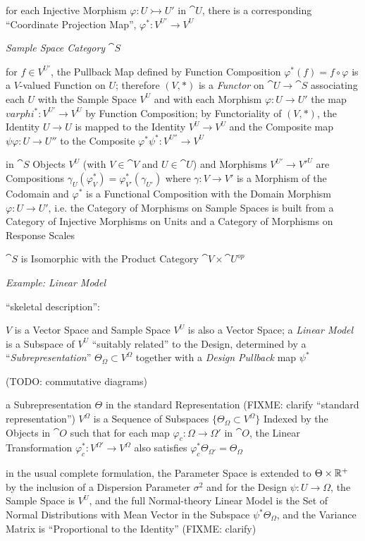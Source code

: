 for each Injective Morphism $\varphi : U \rightarrowtail U'$ in $\cat{U}$, there
is a corresponding ``Coordinate Projection Map'', $\varphi^* : V^{U'} \to V^{U}$

\emph{Sample Space Category} $\cat{S}$

for $f \in V^{U'}$, the Pullback Map defined by Function Composition
$\varphi^* (f) = f \circ \varphi$ is a $V$-valued Function on $U$; therefore
$(V, *)$ is a \emph{Functor} on $\cat{U} \to \cat{S}$ associating each $U$ with
the Sample Space $V^U$ and with each Morphism $\varphi : U \to U'$ the map
$varphi^* : V^{U'} \to V^U$ by Function Composition; by Functoriality of
$(V, *)$, the Identity $U \to U$ is mapped to the Identity $V^U \to V^U$ and the
Composite map $\psi\varphi : U \to U''$ to the Composite
$\varphi^*\psi^* : V^{U''} \to V^U$

in $\cat{S}$ Objects $V^U$ (with $V \in \cat{V}$
and $U \in \cat{U}$) and Morphisms $V^{U'} \to V'^{U}$ are Compositions
$\gamma_U(\varphi_V^*) = \varphi_{V'}^*(\gamma_{U'})$ where $\gamma : V \to V'$
is a Morphism of the Codomain and $\varphi^*$ is a  Functional Composition with
the Domain Morphism $\varphi : U \to U'$, i.e. the Category of Morphisms on
Sample Spaces is built from a Category of Injective Morphisms on Units and a
Category of Morphisms on Response Scales

$\cat{S}$ is Isomorphic with the Product Category $\cat{V} \times \cat{U}^{op}$

\emph{Example: Linear Model}

``skeletal description'':

$V$ is a Vector Space and Sample Space $V^U$ is also a Vector Space; a
\emph{Linear Model} is a Subspace of $V^U$ ``suitably related'' to the Design,
determined by a ``\emph{Subrepresentation}'' $\Theta_\Omega \subset V^{\Omega}$
together with a \emph{Design Pullback} map $\psi^*$

(TODO: commutative diagrams)

a Subrepresentation $\Theta$ in the standard Representation (FIXME: clarify
``standard representation'') $V^{\Omega}$ is a
Sequence of Subspaces $\{ \Theta_\Omega \subset V^\Omega \}$ Indexed by the
Objects in $\cat{O}$ such that for each map $\varphi_c : \Omega \to \Omega'$ in
$\cat{O}$, the Linear Transformation $\varphi_c^* : V^{\Omega'} \to V^\Omega$
also satisfies $\varphi_c^* \Theta_{\Omega'} = \Theta_\Omega$

in the usual complete formulation, the Parameter Space is extended to
$\Theta \times \mathbb{R}^+$ by the inclusion of a Dispersion Parameter $\sigma^2$
and for the Design $\psi : U \to \Omega$, the Sample Space is $V^U$, and the
full Normal-theory Linear Model is the Set of Normal Distributions with Mean
Vector in the Subspace $\psi^*\Theta_\Omega$, and the Variance Matrix is
``Proportional to the Identity'' (FIXME: clarify)

